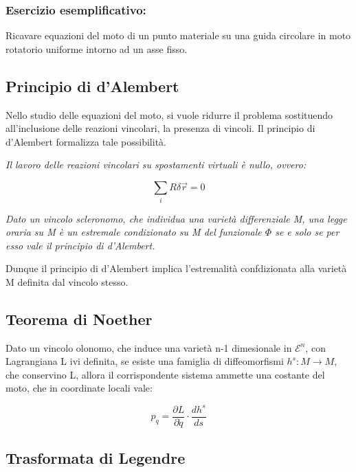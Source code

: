 \documentclass{article}
\begin{document}
            \subsubsection{Esercizio esemplificativo:}
            Ricavare equazioni del moto di un punto materiale su una guida circolare in moto rotatorio uniforme intorno ad un asse fisso.

            \subsection{Principio di d'Alembert}
            Nello studio delle equazioni del moto, si vuole ridurre il problema sostituendo all'inclusione delle reazioni vincolari, la presenza di vincoli. Il principio di d'Alembert formalizza tale possibilità.

            \textit{Il lavoro delle reazioni vincolari su spostamenti virtuali è nullo, ovvero:}

            \begin{equation}
                \sum_i R \delta \vec{r}=0
            \end{equation}

            \textit{Dato un vincolo scleronomo, che individua una varietà differenziale M, una legge oraria su M è un estremale condizionato su M del funzionale $\Phi$ se e solo se per esso vale il principio di d'Alembert.}




            Dunque il principio di d'Alembert implica l'estremalità confdizionata alla varietà M definita dal vincolo stesso.

            \subsection{Teorema di Noether}
            Dato un vincolo olonomo, che induce una varietà n-1 dimesionale in $\mathcal{E}^n$, con Lagrangiana L ivi definita, se esiste una famiglia di diffeomorfismi $h^s: M\rightarrow M$, che conservino L, allora il corrispondente sistema ammette una costante del moto, che in coordinate locali vale:

            \begin{equation}
                p_q= \frac{\partial L}{\partial \dot q}\cdot \frac{d h^s}{ds}
            \end{equation}

            \subsection{Trasformata di Legendre}
\end{document}
